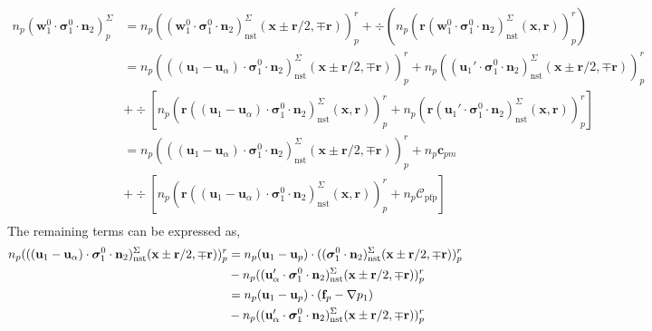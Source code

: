 \begin{align*}
    n_p (\textbf{w}_1^0 \cdot \bm{\sigma}_1^0 \cdot \textbf{n}_2)^\Sigma_p
    &= 
    n_p ((\textbf{w}_1^0 \cdot \bm{\sigma}_1^0 \cdot \textbf{n}_2)^\Sigma_\text{nst}(\textbf{x}\pm\textbf{r}/2,\mp\textbf{r}) )_p^r 
    + \div (n_p ( \textbf{r}(\textbf{w}_1^0 \cdot \bm{\sigma}_1^0 \cdot \textbf{n}_2)^\Sigma_\text{nst}(\textbf{x},\textbf{r}) )_p^r )\\
    &= 
    n_p (((\textbf{u}_1-\textbf{u}_\alpha) \cdot \bm{\sigma}_1^0 \cdot \textbf{n}_2)^\Sigma_\text{nst}(\textbf{x}\pm\textbf{r}/2,\mp\textbf{r}) )_p^r 
    +n_p ((\textbf{u}_1' \cdot \bm{\sigma}_1^0 \cdot \textbf{n}_2)^\Sigma_\text{nst}(\textbf{x}\pm\textbf{r}/2,\mp\textbf{r}) )_p^r \\
    &+ \div [n_p ( \textbf{r}((\textbf{u}_1 - \textbf{u}_\alpha) \cdot \bm{\sigma}_1^0 \cdot \textbf{n}_2)^\Sigma_\text{nst}(\textbf{x},\textbf{r}) )_p^r 
    + n_p ( \textbf{r}(\textbf{u}_1' \cdot \bm{\sigma}_1^0 \cdot \textbf{n}_2)^\Sigma_\text{nst}(\textbf{x},\textbf{r}) )_p^r ]\\
    &= 
    n_p (((\textbf{u}_1-\textbf{u}_\alpha) \cdot \bm{\sigma}_1^0 \cdot \textbf{n}_2)^\Sigma_\text{nst}(\textbf{x}\pm\textbf{r}/2,\mp\textbf{r}) )_p^r 
    +n_p \textbf{c}_{pm} \\
    &+ \div [n_p ( \textbf{r}((\textbf{u}_1 - \textbf{u}_\alpha) \cdot \bm{\sigma}_1^0 \cdot \textbf{n}_2)^\Sigma_\text{nst}(\textbf{x},\textbf{r}) )_p^r 
    + n_p \mathcal{C}_\text{pfp}]\\
\end{align*}
The remaining terms can be expressed as, 
\begin{align*}
    n_p (((\textbf{u}_1-\textbf{u}_\alpha) \cdot \bm{\sigma}_1^0 \cdot \textbf{n}_2)^\Sigma_\text{nst}(\textbf{x}\pm\textbf{r}/2,\mp\textbf{r}) )_p^r 
    &= 
    n_p (\textbf{u}_1 - \textbf{u}_p) \cdot (( \bm{\sigma}_1^0 \cdot \textbf{n}_2)^\Sigma_\text{nst}(\textbf{x}\pm\textbf{r}/2,\mp\textbf{r}) )_p^r \\
    &- n_p (( \textbf{u}_\alpha' \cdot \bm{\sigma}_1^0 \cdot \textbf{n}_2)^\Sigma_\text{nst}(\textbf{x}\pm\textbf{r}/2,\mp\textbf{r}) )_p^r \\
    &= 
    n_p (\textbf{u}_1 - \textbf{u}_p) \cdot(\textbf{f}_p - \mathbf{\nabla} p_1) \\
    &- n_p (( \textbf{u}_\alpha' \cdot \bm{\sigma}_1^0 \cdot \textbf{n}_2)^\Sigma_\text{nst}(\textbf{x}\pm\textbf{r}/2,\mp\textbf{r}) )_p^r \\
\end{align*}
